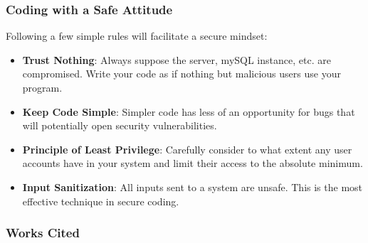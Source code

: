 \documentclass[aspectratio=169]{beamer}
\begin{document}
\begin{frame}
\frametitle{Coding with a Safe Attitude}
Following a few simple rules will facilitate a secure mindset:
\begin{itemize}
	\item \textbf{Trust Nothing}: Always suppose the server, mySQL instance, etc. are compromised. Write your code as if nothing but malicious users use your program.
	\item \textbf{Keep Code Simple}: Simpler code has less of an opportunity for bugs that will potentially open security vulnerabilities.
	\item \textbf{Principle of Least Privilege}: Carefully consider to what extent any user accounts have in your system and limit their access to the absolute minimum.
	\item \textbf{Input Sanitization}: All inputs sent to a system are unsafe. This is the most effective technique in secure coding.
\end{itemize}
\end{frame}

\begin{frame}
\frametitle{Works Cited}

\end{frame}
\end{document}
